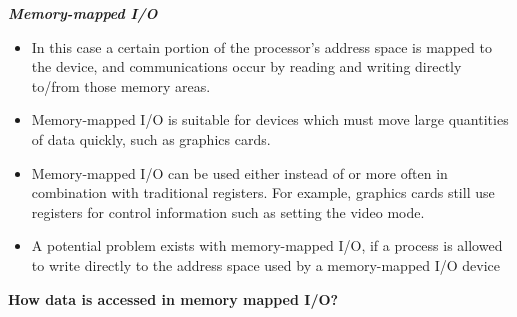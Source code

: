 \documentclass[12pt]{article}
\begin{document}
\vspace{\baselineskip}
{\fontsize{20pt}{24.0pt}\selectfont \textbf{\textit{Memory-mapped I/O}}\par}\par

\begin{itemize}
	\item In this case a certain portion of the processor's address space is mapped to the device, and communications occur by reading and writing directly to/from those memory areas.\par

	\item Memory-mapped I/O is suitable for devices which must move large quantities of data quickly, such as graphics cards.\par

	\item Memory-mapped I/O can be used either instead of or more often in combination with traditional registers. For example, graphics cards still use registers for control information such as setting the video mode.\par

	\item A potential problem exists with memory-mapped I/O, if a process is allowed to write directly to the address space used by a memory-mapped I/O device
\end{itemize}\par

\textbf{How data is accessed in memory mapped I/O?}\par
\end{document}
